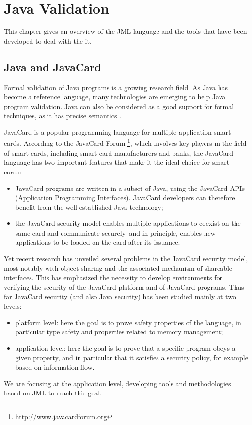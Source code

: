 \chapter{Java Validation}
This chapter gives an overview of the JML language and the tools that have been developed to deal with the it.

\section{Java and JavaCard}
 Formal validation of Java programs is a growing research
 field.  As Java has become a reference language, many technologies are
 emerging to help Java program validation.  Java can also be
 considered as a good support for formal techniques, as it has precise 
semantics \cite{Gosl00a}.

JavaCard is a popular programming language for multiple
application smart cards.  According to the JavaCard Forum \footnote{http://www.javacardforum.org},
which involves key players in the field of smart cards, 
including smart card manufacturers and banks, the JavaCard language has two
important features that make it the ideal choice for smart cards: 
\begin{itemize}
\item JavaCard programs are written in a subset of Java, using
the JavaCard APIs (Application Programming Interfaces). JavaCard
developers can therefore benefit from the well-established Java technology; 

\item the JavaCard security model enables multiple applications to
coexist  on the same card and communicate securely, and in principle,
enables new applications to be loaded on the card after its issuance.
\end{itemize}
Yet recent research has unveiled several problems in the JavaCard
security model, most notably with object sharing and the associated
mechanism of shareable interfaces.
This has  emphasized the necessity to develop environments for
verifying the security of the JavaCard platform and of JavaCard
programs.  Thus far JavaCard security (and also Java security) has
been studied  mainly at two levels:    
\begin{itemize}
\item  platform level: here the goal is to prove safety properties of
the language, in particular type safety and properties related to
memory management; 
\item  application level: here the goal is to prove that a specific
program obeys a given property, and in particular that it satisfies a
security policy, for example based on information flow. 
\end{itemize}
We are focusing at the application level, developing tools and methodologies based on JML to reach this goal.
